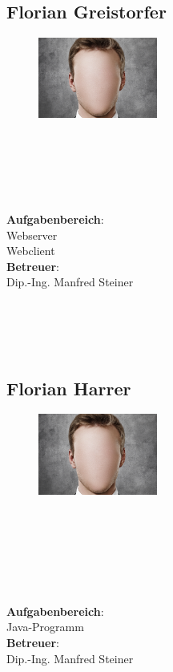 \subsection*{Florian Greistorfer}
\begin{figure}
\begin{center}
  \includegraphics[width=0.35\textwidth]{Bilder/face.jpg}
\end{center}
\end{figure}
\mbox{}\\
\mbox{}\\
\mbox{}\\
\mbox{}\\
\mbox{}\\
\textbf{Aufgabenbereich}:\\
Webserver\\
Webclient\\
\textbf{Betreuer}:\\
Dip.-Ing. Manfred Steiner
\mbox{}\\
\mbox{}\\
\mbox{}\\
\mbox{}\\
\mbox{}\\

\subsection*{Florian Harrer}
\begin{figure}
\begin{center}
  \includegraphics[width=0.35\textwidth]{Bilder/face.jpg}
\end{center}
\end{figure}
\mbox{}\\
\mbox{}\\
\mbox{}\\
\mbox{}\\
\mbox{}\\
\mbox{}\\
\textbf{Aufgabenbereich}:\\
Java-Programm\\
\textbf{Betreuer}:\\
Dip.-Ing. Manfred Steiner
\mbox{}\\
\mbox{}\\
\mbox{}\\
\mbox{}\\
\mbox{}\\
\newpage

